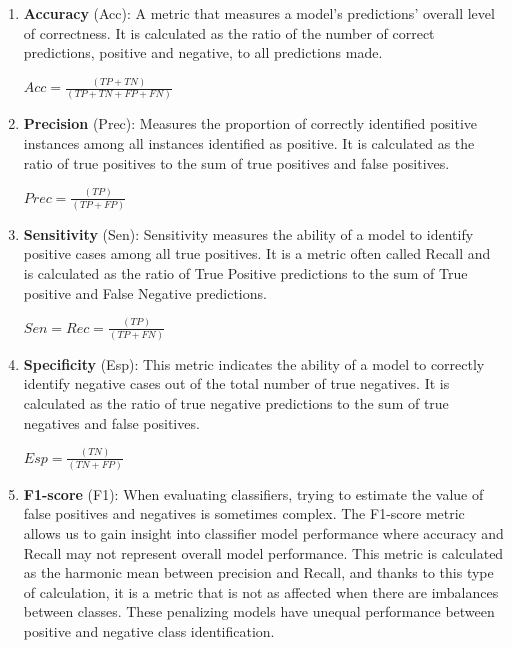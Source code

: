 \begin{enumerate}
    \item \textbf{Accuracy} (Acc):  A metric that measures a model's predictions' overall level of correctness. It is calculated as the ratio of the number of correct predictions, positive and negative, to all predictions made.    
    
    \hspace{5cm} $Acc = \frac{(TP + TN)}{(TP + TN + FP + FN)}$    
          
    \item \textbf{Precision} (Prec): Measures the proportion of correctly identified positive instances among all instances identified as positive. It is calculated as the ratio of true positives to the sum of true positives and false positives.
    
    \hspace{5cm} $Prec = \frac{(TP)}{(TP + FP)}$
          
    \item \textbf{Sensitivity} (Sen): Sensitivity measures the ability of a model to identify positive cases among all true positives. It is a metric often called Recall and is calculated as the ratio of True Positive predictions to the sum of True positive and False Negative predictions.

    \hspace{5cm} $Sen = Rec = \frac{(TP)}{(TP + FN)}$
    
    \item \textbf{Specificity} (Esp): This metric indicates the ability of a model to correctly identify negative cases out of the total number of true negatives. It is calculated as the ratio of true negative predictions to the sum of true negatives and false positives.

    \hspace{5cm} $Esp = \frac{(TN)}{(TN + FP)}$
    
    \item \textbf{F1-score} (F1): When evaluating classifiers, trying to estimate the value of false positives and negatives is sometimes complex. The F1-score metric allows us to gain insight into classifier model performance where accuracy and Recall may not represent overall model performance. This metric is calculated as the harmonic mean between precision and Recall, and thanks to this type of calculation, it is a metric that is not as affected when there are imbalances between classes. These penalizing models have unequal performance between positive and negative class identification. 


\end{enumerate}
